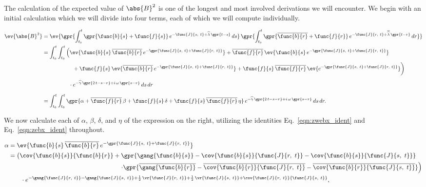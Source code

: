 The calculation of the expected value of $\abs{B}^2$ is one of the longest and most involved derivations we will encounter. We begin with an initial calculation which we will divide into four terms, each of which we will compute individually.

\begin{align}
    \ev{\abs{B}^2} &= \ev{\gpr{\int_{t_0}^{t} \gpr{\func{b}{s} + \func{f}{s}}\,e^{-\func{J}{s,\ t} + \widehat{\lambda}\,\gpr{t - s}}\,ds}\,\gpr{\int_{t_0}^{t} \gpr{\overline{\func{b}{r}} + \func{f}{r}}\,e^{-\func{J}{r,\ t} + \overline{\widehat{\lambda}}\,\gpr{t - r}}\,dr}} \nonumber \\
    	&= \int_{t_0}^{t} \int_{t_0}^{t} \left( \ev{\func{b}{s}\,\overline{\func{b}{r}}\,e^{-\gpr{\func{J}{s,\ t} + \func{J}{r,\ t}}}} + \overline{\func{f}{r}}\,\ev{\func{b}{s}\,e^{-\gpr{\func{J}{s,\ t} + \func{J}{r,\ t}}}} \right. \nonumber \\
    		&\left.\phantom{\int_{t_0}^{t} \int_{t_0}^{t} (}\qquad + \func{f}{s}\,\ev{\overline{\func{b}{r}}\,e^{-\gpr{\func{J}{s,\ t} + \func{J}{r,\ t}}}} + \func{f}{s}\,\overline{\func{f}{r}}\,\ev{e^{-\gpr{\func{J}{s,\ t} + \func{J}{r,\ t}}}}\right) \nonumber \\
    		&\phantom{\int_{t_0}^{t} \int_{t_0}^{t}}\qquad \cdot e^{- \widehat{\gamma}\,\gpr{2\,t - s - r} + i\,\omega\,\gpr{s - r}}\,ds\,dr \nonumber \\
    	&= \int_{t_0}^{t} \int_{t_0}^{t} \gpr{\alpha + \overline{\func{f}{r}}\,\beta + \func{f}{s}\,\delta +  \func{f}{s}\,\overline{\func{f}{r}}\,\eta}\,e^{- \widehat{\gamma}\,\gpr{2\,t - s - r} + i\,\omega\,\gpr{s - r}}\,ds\,dr. \label{eqn:pre_mean_absB2}
\end{align}


We now calculate each of $\alpha$, $\beta$, $\delta$, and $\eta$ of the expression on the right, utilizing the identities Eq.~\ref{eqn:zwebx_ident} and Eq.~\ref{eqn:zebx_ident} throughout.

\begin{align}
    \alpha &= \ev{\func{b}{s}\,\overline{\func{b}{r}}\,e^{-\gpr{\func{J}{s,\ t} + \func{J}{r,\ t}}}}\nonumber \\
    	&= \left( \cov{\func{b}{s}}{\func{b}{r}} + \gpr{\gang{\func{b}{s}} - \cov{\func{b}{s}}{\func{J}{r,\ t}} - \cov{\func{b}{s}}{\func{J}{s,\ t}}} \phantom{\overline{b}}\right. \nonumber \\
    		&\phantom{\cov{\func{b}{s}}{\func{b}{r}} +}\qquad \left. \cdot \gpr{\overline{\gang{\func{b}{r}}} - \overline{\cov{\func{b}{r}}{\func{J}{r,\ t}}} - \overline{\cov{\func{b}{r}}{\func{J}{s,\ t}}}} \right) \nonumber \\
    		&\qquad \cdot e^{-\gang{\func{J}{r,\ t}} - \gang{\func{J}{s,\ t}} + \frac{1}{2}\,\vr{\func{J}{r,\ t}} + \frac{1}{2}\,\vr{\func{J}{s,\ t}} + \cov{\func{J}{r,\ t}}{\func{J}{s,\ t}}},
\end{align}

